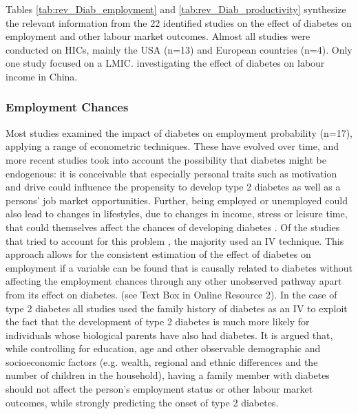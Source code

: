 \documentclass[12pt,english]{article}
\begin{document}
Tables \ref{tab:rev_Diab_employment} and \ref{tab:rev_Diab_productivity} synthesize the relevant information from the 22 identified studies on the effect of diabetes on employment and other labour market outcomes. Almost all studies were conducted on \acp{HIC}, mainly the USA (n=13) and European countries (n=4). Only one study focused on a \ac{LMIC}. investigating the effect of diabetes on labour income in China.

\subsubsection{Employment Chances}
Most studies examined the impact of diabetes on employment probability (n=17), applying a range of econometric techniques. These have evolved over time, and more recent studies took into account the possibility that diabetes might be endogenous: it is conceivable that especially personal traits such as motivation and drive could influence the propensity to develop type 2 diabetes as well as a persons' job market opportunities. Further, being employed or unemployed could also lead to changes in lifestyles, due to changes in income, stress or leisure time, that could themselves affect the chances of developing diabetes \parencite{Brown2005d}. Of the studies that tried to account for this problem \parencite{Brown2005d,Minor2011a,Latif2009b,Lin2011b,Zhang2009k,Harris2009}, the majority used an \ac{IV} technique. This approach allows for the consistent estimation of the effect of diabetes on employment if a variable can be found that is causally related to diabetes without affecting the employment chances through any other unobserved pathway apart from its effect on diabetes. (see Text Box in Online Resource 2). In the case of type 2 diabetes all studies used the family history of diabetes as an \ac{IV} to exploit the fact that the development of type 2 diabetes is much more likely for individuals whose biological parents have also had diabetes. It is argued that, while controlling for education, age and other observable demographic and socioeconomic factors (e.g. wealth, regional and ethnic differences and the number of children in the household), having a family member with diabetes should not affect the person's employment status or other labour market outcomes, while strongly predicting the onset of type 2 diabetes. 
\end{document}

